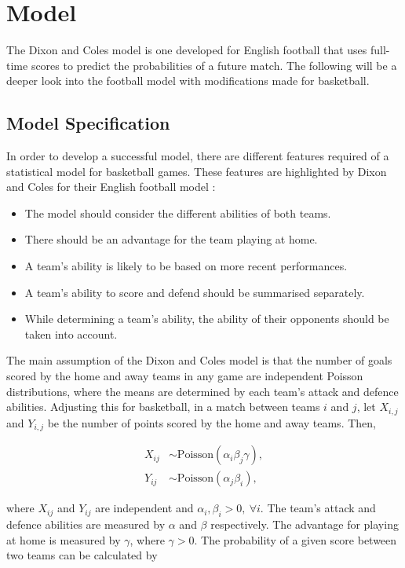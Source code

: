 \chapter{Model}\label{chapter:model}
The Dixon and Coles model is one developed for English football that uses full-time scores to predict the probabilities of a future match.  The following will be a deeper look into the football model with modifications made for basketball.

\section{Model Specification}
In order to develop a successful model, there are different features required of a statistical model for basketball games. These features are highlighted by Dixon and Coles for their English football model \citep{dixon_coles}:

\begin{itemize}
	\item The model should consider the different abilities of both teams.
	\item There should be an advantage for the team playing at home.
	\item A team's ability is likely to be based on more recent performances.
	\item A team's ability to score and defend should be summarised separately.
	\item While determining a team's ability, the ability of their opponents should be taken into account.
\end{itemize}

The main assumption of the Dixon and Coles model is that the number of goals scored by the home and away teams in any game are independent Poisson distributions, where the means are determined by each team's attack and defence abilities.  Adjusting this for basketball, in a match between teams $i$ and $j$, let $X_{i,j}$ and $Y_{i,j}$ be the number of points scored by the home and away teams.  Then, 

\begin{equation}
\begin{split}
X_{ij} & \sim \text{Poisson}(\alpha_i\beta_j\gamma),\\
Y_{ij} & \sim \text{Poisson}(\alpha_j\beta_i),
\end{split}
\end{equation}


where $X_{ij}$ and $Y_{ij}$ are independent and $\alpha_i, \beta_i > 0,\ \forall i$.  The team's attack and defence abilities are measured by $\alpha$ and $\beta$ respectively.  The advantage for playing at home is measured by $\gamma$, where $\gamma > 0$.  The probability of a given score between two teams can be calculated by

